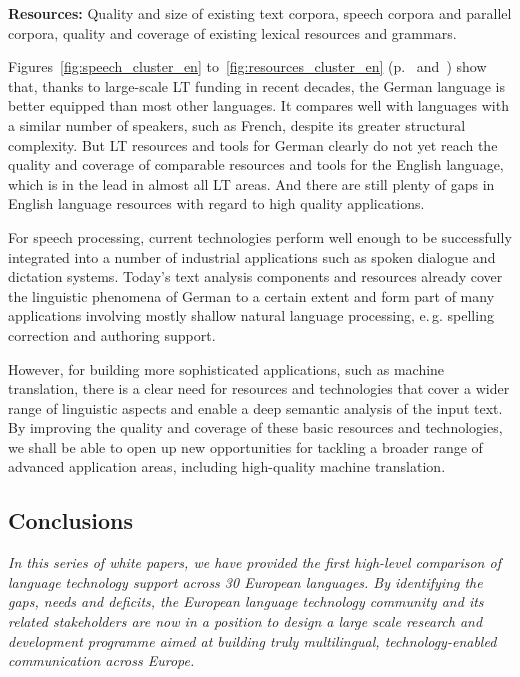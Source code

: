 \begin{multicols}{2}
\textbf{Resources:} Quality and size of existing text corpora, speech corpora and parallel corpora, quality and coverage of existing lexical resources and grammars.

Figures~\ref{fig:speech_cluster_en} to~\ref{fig:resources_cluster_en} (p.~\pageref{fig:speech_cluster_en} and~\pageref{fig:resources_cluster_en}) show that, thanks to large-scale LT funding in recent decades, the German language is better equipped than most other languages. It compares well with languages with a similar number of speakers, such as French, despite its greater structural complexity. But LT resources and tools for German clearly do not yet reach the quality and coverage of comparable resources and tools for the English language, which is in the lead in almost all LT areas. And there are still plenty of gaps in English language resources with regard to high quality applications.

For speech processing, current technologies perform well enough to be successfully integrated into a number of industrial applications such as spoken dialogue and dictation systems. Today’s text analysis components and resources already cover the linguistic phenomena of German to a certain extent and form part of many applications involving mostly shallow natural language processing, e.\,g. spelling correction and authoring support.

However, for building more sophisticated applications, such as machine translation, there is a clear need for resources and technologies that cover a wider range of linguistic aspects and enable a deep semantic analysis of the input text. By improving the quality and coverage of these basic resources and technologies, we shall be able to open up new opportunities for tackling a broader range of advanced application areas, including high-quality machine translation.

\subsection{Conclusions}

\emph{In this series of white papers, we have provided the first high-level comparison of language technology support across 30 European languages.
By identifying the gaps, needs and deficits, the European language technology community and its related stakeholders are now in a position to design a large scale research and development programme aimed at building truly multilingual, technology-enabled communication across Europe.}


\end{multicols}
